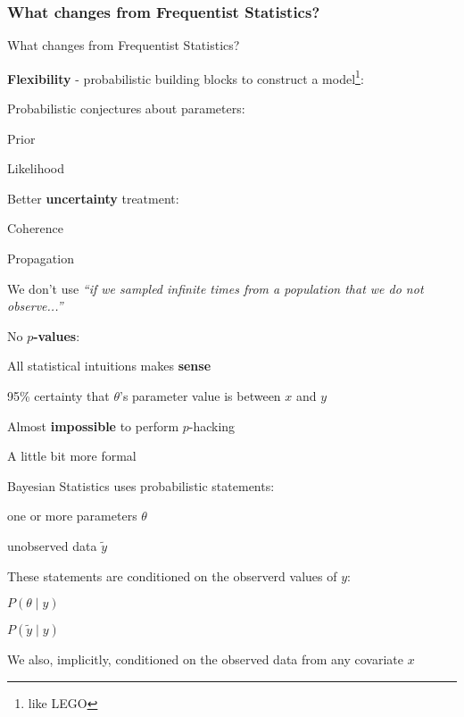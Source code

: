 \subsubsection{What changes from Frequentist Statistics?}
\begin{frame}{What changes from Frequentist Statistics?}
	\begin{vfilleditems}
		\item \textbf{Flexibility} - probabilistic building blocks to
		construct a model\footnote{like LEGO}:
		\begin{vfilleditems}
			\item Probabilistic conjectures about parameters:
			\begin{vfilleditems}
				\item Prior
				\item Likelihood
			\end{vfilleditems}
		\end{vfilleditems}
		\item Better \textbf{uncertainty} treatment:
		\begin{vfilleditems}
			\item Coherence
			\item Propagation
			\item We don't use \textit{``if we sampled infinite times
				from a population that we do not observe...''}
		\end{vfilleditems}
		\item No \textbf{$p$-values}:
		\begin{vfilleditems}
			\item All statistical intuitions makes \textbf{sense}
			\item 95\% certainty that $\theta$'s parameter value is
			between $x$ and $y$
			\item Almost \textbf{impossible} to perform $p$-hacking
		\end{vfilleditems}
	\end{vfilleditems}
\end{frame}

\begin{frame}{A little bit more formal}
	\begin{vfilleditems}
		\item Bayesian Statistics uses probabilistic statements:
		\begin{vfilleditems}
			\item one or more parameters $\theta$
			\item unobserved data $\tilde{y}$
		\end{vfilleditems}
		\item These statements are conditioned on the observerd values of $y$:
		\begin{vfilleditems}
			\item $P(\theta \mid y)$
			\item $P(\tilde{y} \mid y)$
		\end{vfilleditems}
		\item We also, implicitly, conditioned on the observed data from
		any covariate $x$
	\end{vfilleditems}
\end{frame}

